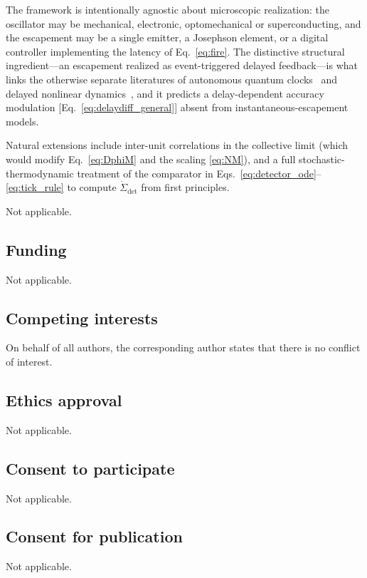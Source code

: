 \documentclass[aps,pre,reprint,amsmath,amssymb,floatfix,nofootinbib]{revtex4-2}
\newcommand{\Sdot}{\dot{\Sigma}}
\begin{document}
The framework is intentionally agnostic about microscopic realization:
the oscillator may be mechanical, electronic, optomechanical or
superconducting, and the escapement may be a single emitter, a Josephson
element, or a digital controller implementing the latency of
Eq.~\eqref{eq:fire}. The distinctive structural ingredient---an
escapement realized as event-triggered delayed feedback---is what links
the otherwise separate literatures of autonomous quantum
clocks~\cite{Erker2017,Brunelli2026} and delayed nonlinear
dynamics~\cite{GiacomelliPoliti1996,YanchukGiacomelli2017}, and it
predicts a delay-dependent accuracy modulation
[Eq.~\eqref{eq:delaydiff_general}] absent from instantaneous-escapement models.

Natural extensions include inter-unit correlations in the collective
limit (which would modify Eq.~\eqref{eq:DphiM} and the scaling
\eqref{eq:NM}), and a full stochastic-thermodynamic treatment of the
comparator in Eqs.~\eqref{eq:detector_ode}--\eqref{eq:tick_rule} to compute $\Sdot_{\mathrm{det}}$
from first principles.


\hypersetup{bookmarksdepth=1}
\backmatter

Not applicable.


\subsection*{Funding}
    Not applicable.

\subsection*{Competing interests}
    On behalf of all authors, the corresponding author states that there is no conflict of interest.

\subsection*{Ethics approval}
    Not applicable.

\subsection*{Consent to participate}
    Not applicable.

\subsection*{Consent for publication}
    Not applicable.
\end{document}
